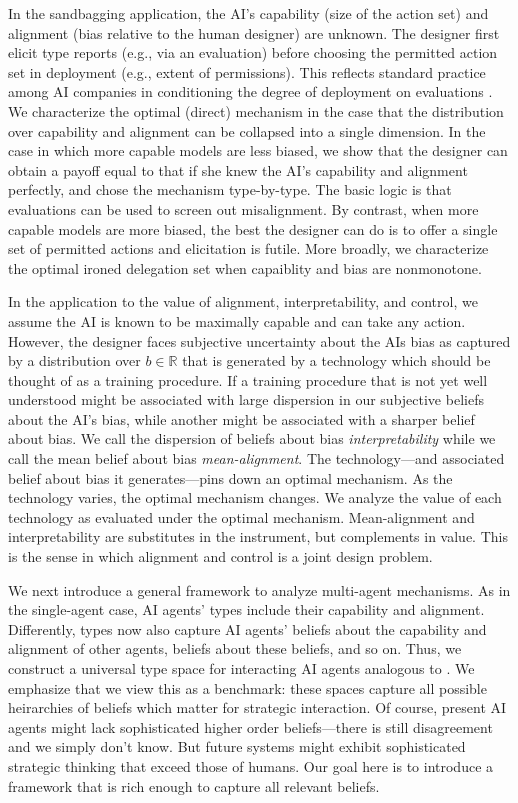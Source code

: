 \documentclass[12pt,reqno]{article}
\theoremstyle{definition} \newtheorem{example}{Example}
\theoremstyle{definition} \newtheorem{condition}{Condition}
\theoremstyle{definition} \newtheorem{corollary}{Corollary}
\theoremstyle{definition} \newtheorem{claim}{Claim}
\theoremstyle{definition} \newtheorem{definition}{Definition}
\theoremstyle{definition} \newtheorem{conjecture}{Conjecture}
\theoremstyle{definition} \newtheorem{Lemma}{Lemma}
\theoremstyle{definition} \newtheorem{lemma}{Lemma}
\theoremstyle{plain} \newtheorem{theorem}{Theorem}
\theoremstyle{definition} \newtheorem{assumption}{Assumption}
\theoremstyle{definition} \newtheorem*{assumptionnonumber}{Assumption}
\theoremstyle{definition} \newtheorem*{theoremNoNumber}{Proposition}
\theoremstyle{definition}\newtheorem{proposition}{Proposition}
\theoremstyle{definition} \newtheorem{observation}{Observation}
\theoremstyle{definition} \newtheorem*{definitionNoNumber}{Definition}
\theoremstyle{definition} \newtheorem{Definition}{Definition}
\theoremstyle{definition} \newtheorem*{DefinitionNoNumber}{Definition}
\theoremstyle{definition} \newtheorem*{fact}{Fact}
\theoremstyle{definition} \newtheorem*{property}{Property}
\theoremstyle{definition} \newtheorem{remark}{Remark}
\theoremstyle{definition}\newtheorem{romanexampleinner}{Example}
\begin{document}
In the sandbagging application, the AI's capability (size of the action set) and alignment (bias relative to the human designer) are unknown. The designer first elicit type reports (e.g., via an evaluation) before choosing the permitted action set in deployment (e.g., extent of permissions). This reflects standard practice among AI companies in conditioning the degree of deployment on evaluations \citep{deepmind2025fsf,anthropic2024rsp}. We characterize the optimal (direct) mechanism in the case that the distribution over capability and alignment can be collapsed into a single dimension. In the case in which more capable models are less biased, we show that the designer can obtain a payoff equal to that if she knew the AI's capability and alignment perfectly, and chose the mechanism type-by-type. The basic logic is that evaluations can be used to screen out misalignment. By contrast, when more capable models are more biased, the best the designer can do is to offer a single set of permitted actions and elicitation is futile. More broadly, we characterize the optimal ironed delegation set when capaiblity and bias are nonmonotone. 

In the application to the value of alignment, interpretability, and control, we assume the AI is known to be maximally capable and can take any action. However, the designer faces subjective uncertainty about the AIs bias as captured by a distribution over $b \in \mathbb{R}$ that is generated by a {technology} which should be thought of as a training procedure. If a training procedure that is not yet well understood might be associated with large dispersion in our subjective beliefs about the AI's bias, while another might be associated with a sharper belief about bias. We call the dispersion of beliefs about bias \emph{interpretability} while we call the mean belief about bias \emph{mean-alignment}. The technology---and associated belief about bias it generates---pins down an optimal mechanism. As the technology varies, the optimal mechanism changes. We analyze the value of each technology as evaluated under the optimal mechanism. Mean-alignment and interpretability are substitutes in the instrument, but complements in value. This is the sense in which alignment and control is a joint design problem. 

We next introduce a general framework to analyze multi-agent mechanisms. As in the single-agent case, AI agents' types include their capability and alignment. Differently, types now also capture AI agents' beliefs about the capability and alignment of other agents, beliefs about these beliefs, and so on. Thus, we construct a universal type space for interacting AI agents analogous to \cite{mertens1985formulation}. We emphasize that we view this as a benchmark: these spaces capture all possible heirarchies of beliefs which matter for strategic interaction. Of course, present AI agents might lack sophisticated higher order beliefs---there is still disagreement and we simply don't know. But future systems might exhibit sophisticated strategic thinking that exceed those of humans. Our goal here is to introduce a framework that is rich enough to capture all relevant beliefs. 
\end{document}
